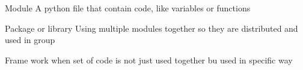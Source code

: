 Module 
  A python file that contain code, like variables or functions

Package or library
  Using multiple modules together so they are distributed and used in group 

Frame work 
  when set of code is not just used together bu used in specific way  
